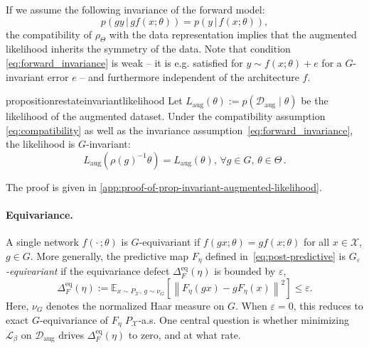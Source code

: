 \documentclass{article}
\begin{document}
If we assume the following invariance of the forward model: 
    \begin{equation} \label{eq:forward_invariance}
        p(gy \, \vert \, gf(x;\theta)) = p(y\, \vert \, f(x;\theta)),
    \end{equation}
 the compatibility of $\rho_{\Theta}$ with the data representation implies that the augmented likelihood inherits the symmetry of the data. Note that condition \eqref{eq:forward_invariance} is weak -- it is e.g.  satisfied for $y\sim f(x;\theta) +e$ for a $G$-invariant error $e$ -- and furthermore independent of the architecture $f$.

\begin{restatable}{proposition}{restateinvariantlikelihood}
\label{prop:invariant-augmented-likelihood}
    Let $L_{\mathrm{aug}}(\theta) := p(\mathcal{D}_{\mathrm{aug}}\mid\theta)$ be the likelihood of the augmented dataset. Under the compatibility assumption \eqref{eq:compatibility}
    as well as the  invariance assumption~\eqref{eq:forward_invariance},
    the likelihood is $G$-invariant:
    \begin{equation}
        L_{\mathrm{aug}}(\rho(g)^{-1}\theta)=L_{\mathrm{aug}}(\theta),\, \forall g \in G,\, \theta \in \Theta\,.
    \end{equation}
\end{restatable}

The proof is given in \cref{app:proof-of-prop-invariant-augmented-likelihood}.

\paragraph{Equivariance.}  A single  network $f(\cdot\,;\theta)$ is $G$-equivariant if $f(gx;\theta) = g f(x;\theta)$ for all $x \in \mathcal{X}$, $g \in G$. More generally, the predictive map $F_\eta$ defined in~\eqref{eq:post-predictive} is \emph{$G_\varepsilon$-equivariant} if the equivariance defect \mbox{$\Delta^{\mathrm{eq}}_{F}(\eta)$} is bounded by $\varepsilon$,
\begin{equation}
    \Delta^{\mathrm{eq}}_{F}(\eta) := \mathbb{E}_{x \sim P_{\mathcal{X}},\, g \sim \nu_{G}}\!\left[\left\|F_{\eta}(gx) - g F_{\eta}(x)\right\|^{2}\right] \leq \varepsilon.
\end{equation}
Here, $\nu_G$ denotes the normalized Haar measure on $G$. When $\varepsilon = 0$, this reduces to exact $G$-equivariance of $F_\eta$ $P_\mathcal{X}$-a.s. One central question is whether minimizing $\mathcal{L}_\beta$ on $\mathcal{D}_\mathrm{aug}$ drives $\Delta^\mathrm{eq}_F(\eta)$ to zero, and at what rate.
\end{document}
